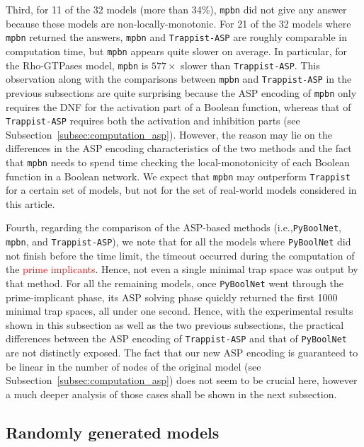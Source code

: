 \documentclass[preprint,12pt]{elsarticle}
\newcommand{\change}[1]{\textcolor{red}{#1}}
\begin{document}
Third, for 11 of the 32 models (more than 34\%), \texttt{mpbn} did not give any answer because these models are non-locally-monotonic.
For 21 of the 32 models where \texttt{mpbn} returned the answers, \texttt{mpbn} and \texttt{Trappist-ASP} are roughly comparable in computation time, but \texttt{mpbn} appears quite slower on average.
In particular, for the Rho-GTPases model, \texttt{mpbn} is \(577\times\) slower than \texttt{Trappist-ASP}.
This observation along with the comparisons between \texttt{mpbn} and \texttt{Trappist-ASP} in the previous subsections are quite surprising because the ASP encoding of \texttt{mpbn} only requires the DNF for the activation part of a Boolean function, whereas that of \texttt{Trappist-ASP} requires both the activation and inhibition parts (see Subsection~\ref{subsec:computation_asp}).
However, the reason may lie on the differences in the ASP encoding characteristics of the two methods and the fact that \texttt{mpbn} needs to spend time checking the local-monotonicity of each Boolean function in a Boolean network.
We expect that \texttt{mpbn} may outperform \texttt{Trappist} for a certain set of models, but not for the set of real-world models considered in this article.

Fourth, regarding the comparison of the ASP-based methods (i.e.,\linebreak \texttt{PyBoolNet}, \texttt{mpbn}, and \texttt{Trappist-ASP}), we note that for all the models where \texttt{PyBoolNet} did not finish before the time limit, the timeout occurred during the computation of the \change{prime implicants}.
Hence, not even a single minimal trap space was output by that method.
For all the remaining models, once \texttt{PyBoolNet} went through the prime-implicant phase, its ASP solving phase quickly returned the first 1000 minimal trap spaces, all under one second.
Hence, with the experimental results shown in this subsection as well as the two previous subsections, the practical differences between the ASP encoding of \texttt{Trappist-ASP} and that of \texttt{PyBoolNet} are not distinctly exposed.
The fact that our new ASP encoding is guaranteed to be linear in the number of nodes of the original model (see Subsection~\ref{subsec:computation_asp}) does not seem to be crucial here, however a much deeper analysis of those cases shall be shown in the next subsection.

\subsection{Randomly generated models}
\end{document}
